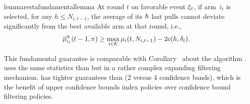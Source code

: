 \begin{figure}
\vspace{-10pt}
\end{figure}

\begin{restatable}{lemma}{restafundamentallemma}
\label{fundamental-lemma}
At round $t$ on favorable event $\xi_t$, if arm~$i_{t}$ is selected, for any $h \leq N_{i,t-1}$,  the average of its $h$ last pulls cannot deviate significantly from the best available arm at that round, i.e.,
%
\vspace{-4pt}
\begin{equation*}
\overline{\mu}^{h}_{i_{t}}(t-1,\pi) \geq \max_{i \in \mathcal{K}}\mu_i(t,N_{i,t-1}) - 2 c(h, \delta_{t}).
\end{equation*}
\end{restatable}

This fundamental guarantee is comparable with Corollary~ %
about the algorithm \FEWA. \FEWA uses the same statistics than \XUCB but in a rather complex expanding filtering mechanism. \EUCB has tighter guarantees than \FEWA (2 versus 4 confidence bands), which is the benefit of upper confidence bounds index policies over confidence bound filtering policies. 
